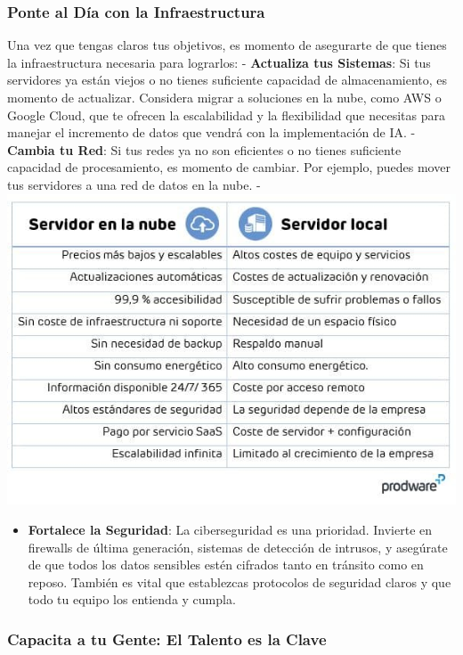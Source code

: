 \documentclass[
  10pt,
  letterpaper,
]{book}
\providecommand{\tightlist}{%
  \setlength{\itemsep}{0pt}\setlength{\parskip}{0pt}}\usepackage{longtable,booktabs,array}
\begin{document}
\subsubsection{\texorpdfstring{\textbf{Ponte al Día con la
Infraestructura}}{Ponte al Día con la Infraestructura}}\label{ponte-al-duxeda-con-la-infraestructura}

Una vez que tengas claros tus objetivos, es momento de asegurarte de que
tienes la infraestructura necesaria para lograrlos: - \textbf{Actualiza
tus Sistemas}: Si tus servidores ya están viejos o no tienes suficiente
capacidad de almacenamiento, es momento de actualizar. Considera migrar
a soluciones en la nube, como AWS o Google Cloud, que te ofrecen la
escalabilidad y la flexibilidad que necesitas para manejar el incremento
de datos que vendrá con la implementación de IA. - \textbf{Cambia tu
Red}: Si tus redes ya no son eficientes o no tienes suficiente capacidad
de procesamiento, es momento de cambiar. Por ejemplo, puedes mover tus
servidores a una red de datos en la nube. -
\includegraphics{Img/cloud.jpg}

\begin{itemize}
\tightlist
\item
  \textbf{Fortalece la Seguridad}: La ciberseguridad es una prioridad.
  Invierte en firewalls de última generación, sistemas de detección de
  intrusos, y asegúrate de que todos los datos sensibles estén cifrados
  tanto en tránsito como en reposo. También es vital que establezcas
  protocolos de seguridad claros y que todo tu equipo los entienda y
  cumpla.
\end{itemize}

\subsubsection{\texorpdfstring{\textbf{Capacita a tu Gente: El Talento
es la
Clave}}{Capacita a tu Gente: El Talento es la Clave}}\label{capacita-a-tu-gente-el-talento-es-la-clave}
\end{document}
